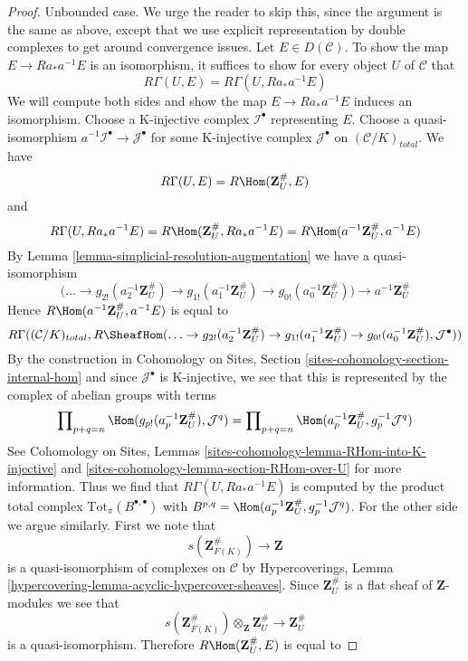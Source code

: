 \begin{proof}
\medskip\noindent
Unbounded case. We urge the reader to skip this, since the argument
is the same as above, except that we use explicit representation
by double complexes to get around convergence issues.
Let $E \in D(\mathcal{C})$.
To show the map $E \to Ra_*a^{-1}E$ is an isomorphism,
it suffices to show for every object $U$ of $\mathcal{C}$ that
$$
R\Gamma(U, E) = R\Gamma(U, Ra_*a^{-1}E)
$$
We will compute both sides and show the map $E \to Ra_*a^{-1}E$
induces an isomorphism. Choose a K-injective
complex $\mathcal{I}^\bullet$ representing $E$. Choose a quasi-isomorphism
$a^{-1}\mathcal{I}^\bullet \to \mathcal{J}^\bullet$
for some K-injective complex $\mathcal{J}^\bullet$ on
$(\mathcal{C}/K)_{total}$. We have
$$
R\Gamma(U, E) = R\Hom(\mathbf{Z}_U^\#, E)
$$
and
$$
R\Gamma(U, Ra_*a^{-1}E) = R\Hom(\mathbf{Z}_U^\#, Ra_*a^{-1}E) =
R\Hom(a^{-1}\mathbf{Z}_U^\#, a^{-1}E)
$$
By Lemma \ref{lemma-simplicial-resolution-augmentation}
we have a quasi-isomorphism
$$
\Big(\ldots \to
g_{2!}(a_2^{-1}\mathbf{Z}_U^\#) \to
g_{1!}(a_1^{-1}\mathbf{Z}_U^\#) \to
g_{0!}(a_0^{-1}\mathbf{Z}_U^\#)\Big)
\longrightarrow
a^{-1}\mathbf{Z}_U^\#
$$
Hence $R\Hom(a^{-1}\mathbf{Z}_U^\#, a^{-1}E)$ is equal to
$$
R\Gamma((\mathcal{C}/K)_{total},
R\SheafHom(
\ldots \to
g_{2!}(a_2^{-1}\mathbf{Z}_U^\#) \to
g_{1!}(a_1^{-1}\mathbf{Z}_U^\#) \to
g_{0!}(a_0^{-1}\mathbf{Z}_U^\#),
\mathcal{J}^\bullet))
$$
By the construction in Cohomology on Sites, Section
\ref{sites-cohomology-section-internal-hom}
and since $\mathcal{J}^\bullet$ is K-injective, we see that
this is represented by the complex of abelian groups with terms
$$
\prod\nolimits_{p + q = n}
\Hom(g_{p!}(a_p^{-1}\mathbf{Z}_U^\#), \mathcal{J}^q) =
\prod\nolimits_{p + q = n}
\Hom(a_p^{-1}\mathbf{Z}_U^\#, g_p^{-1}\mathcal{J}^q)
$$
See Cohomology on Sites, Lemmas
\ref{sites-cohomology-lemma-RHom-into-K-injective} and
\ref{sites-cohomology-lemma-section-RHom-over-U} for more information.
Thus we find that $R\Gamma(U, Ra_*a^{-1}E)$ is computed by
the product total complex $\text{Tot}_\pi(B^{\bullet, \bullet})$
with $B^{p, q} = \Hom(a_p^{-1}\mathbf{Z}_U^\#, g_p^{-1}\mathcal{J}^q)$.
For the other side we argue similarly. First we note that
$$
s(\mathbf{Z}_{F(K)}^\#) \longrightarrow \mathbf{Z}
$$
is a quasi-isomorphism of complexes on $\mathcal{C}$
by Hypercoverings, Lemma \ref{hypercovering-lemma-acyclic-hypercover-sheaves}.
Since $\mathbf{Z}_U^\#$ is a flat sheaf of $\mathbf{Z}$-modules
we see that
$$
s(\mathbf{Z}_{F(K)}^\#) \otimes_\mathbf{Z} \mathbf{Z}_U^\#
\longrightarrow
\mathbf{Z}_U^\#
$$
is a quasi-isomorphism. Therefore
$R\Hom(\mathbf{Z}_U^\#, E)$ is equal to

\end{proof}
